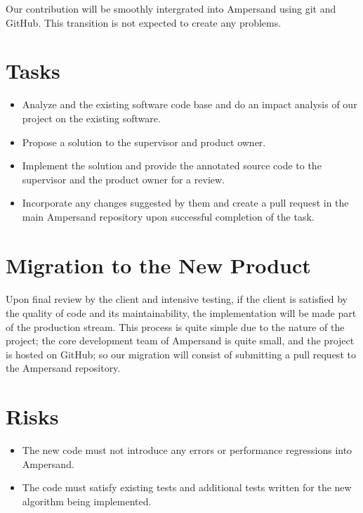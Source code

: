 \documentclass[12pt]{report}
\begin{document}
Our contribution will be smoothly intergrated into Ampersand using git and GitHub. 
This transition is not expected to create any problems. 
%
\section{Tasks}\label{sec:Tasks}
\begin{itemize}
\item Analyze and the existing software code base and do an impact analysis of our project on the existing software.
\item Propose a solution to the supervisor and product owner.
\item Implement the solution and provide the  annotated source code to the supervisor and the product owner for a review.
\item Incorporate any changes suggested by them and create a pull request in the main Ampersand repository upon successful completion of the task.
\end{itemize}
%
\section{Migration to the New Product}\label{sec:Migration}
\paragraph*{}
Upon final review by the client and intensive testing, if the client is
satisfied by the quality of code and its maintainability, the implementation
will be made part of the production stream.  This process is quite simple due to
the nature of the project; the core development team of Ampersand is quite
small, and the project is hosted on GitHub; so our migration will consist of
submitting a pull request to the Ampersand repository.
\section{Risks}\label{sec:Risks}
\begin{itemize}
\item The new code must not introduce any 
errors or performance regressions
into Ampersand.
\item The code must satisfy existing tests and 
additional tests written for the new algorithm being implemented.
\end{itemize}
\end{document}
